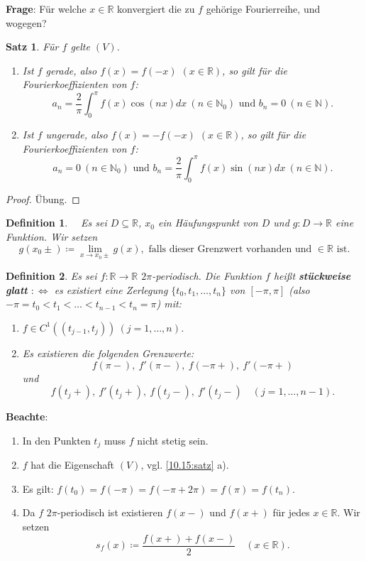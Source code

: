\documentclass[12pt]{extreport} %
\newcommand{\N}{\mathbb{N}}
\newcommand{\R}{\mathbb{R}}
\theoremstyle{named}
\theoremstyle{itshape}
\newtheorem{satz}[unnamedtheorem]{Satz}
\newtheorem*{definition}{Definition}
\theoremstyle{normal}
\begin{document}
{\textbf{Frage}: Für welche $x \in \R$ konvergiert die zu $f$ gehörige Fourierreihe, und wogegen?

\begin{satz} \label{13.2:satz}
	Für $f$ gelte $(V)$.
	\begin{enumerate}
		\item Ist $f$ gerade, also $f(x) = f(-x)$ $(x \in \R)$, so gilt für die Fourierkoeffizienten von $f$:
			$$ a_{n} = \frac{2}{\pi} \int_{0}^{\pi} f(x) \cos(nx) dx ~ (n \in \N_0) \text{ und } b_{n} = 0 ~ (n \in \N). $$
		\item Ist $f$ ungerade, also $f(x) = -f(-x)$ $(x \in \R)$, so gilt für die Fourierkoeffizienten von $f$:
			$$ a_{n} = 0 ~ (n \in \N_0) \text{ und } b_{n} = \frac{2}{\pi} \int_{0}^{\pi} f(x) \sin(nx) dx ~ (n \in \N).  $$
	\end{enumerate}	
\end{satz}

\begin{proof}
	Übung.
\end{proof}

 
\begin{definition} ~\
Es sei $D \subseteq \R$, $x_{0}$ ein Häufungspunkt von $D$ und $g \colon D \rightarrow \R$ eine Funktion. Wir setzen
			$$ g(x_{0}\pm) \coloneqq \lim_{x \rightarrow x_{0} \pm } g(x), \text{ falls dieser Grenzwert vorhanden und $\in \R$ ist}. $$	
\end{definition}


\begin{definition}
	Es sei $f:\R \to \R$ $2\pi$-periodisch. Die Funktion $f$ hei{\ss}t \textbf{stückweise glatt} $:\iff$ es existiert eine Zerlegung $\{ t_{0}, t_{1}, \dotsc, t_{n} \}$ 
	von $[-\pi, \pi]$ (also $-\pi = t_{0} < t_{1} < \dotsc < t_{n-1} < t_{n} = \pi$) mit:
	\begin{enumerate}[label=\roman*\upshape)]
		\item $f \in C^{1} \left( (t_{j-1}, t_{j}) \right) ~(j = 1, \dotsc, n)$.
		\item Es existieren die folgenden Grenzwerte: 
			$$ f(\pi-), ~ f'(\pi-), ~ f(-\pi+), ~ f'(-\pi+) $$ 
			und
			$$ f(t_{j}+), ~ f'(t_{j}+), ~f(t_{j}-), ~f'(t_{j}-) \quad (j =1, \dotsc, n - 1). $$
	\end{enumerate}	
\end{definition}


\textbf{Beachte}: 
\begin{enumerate}
        \item In den Punkten $t_{j}$ muss $f$ nicht stetig sein.
	\item $f$ hat die Eigenschaft $(V)$, vgl. \ref{10.15:satz} a).   
	\item Es gilt: $f(t_{0}) = f(-\pi) = f(-\pi + 2\pi) = f(\pi) = f(t_{n})$.
	\item Da $f$ $2\pi$-periodisch ist existieren $f(x-)$ und $f(x+)$ für jedes $x \in \R$. Wir setzen
		$$ s_{f}(x) \coloneqq \frac{f(x+) + f(x-)}{2} \quad (x \in \R). $$
\end{enumerate}



}
\end{document}

